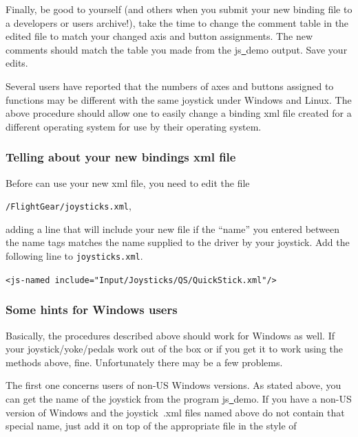 Finally, be good to yourself (and others when you submit your new binding file to a \FlightGear{} developers or users archive!), take the time to change the comment table in the edited file to match your changed axis and button assignments.  The new comments should match the table you made from the js\underline{~}demo output.  Save your edits.

Several users have reported that the numbers of axes and buttons assigned to functions may be different with the same joystick under Windows and Linux.  The above procedure should allow one to easily change a binding xml file created for a different operating system for use by their operating system.

\subsubsection{Telling \FlightGear{} about your new bindings xml file\label{telling}}
Before \FlightGear{} can use your new xml file, you need to edit the file

\noindent
 \texttt{/FlightGear/joysticks.xml},


\noindent 
adding a line that will include your new file if the ``name'' you entered between the name tags matches the name supplied to the driver by your joystick.  Add the following line to \texttt{joysticks.xml}.
\medskip

\noindent
	\texttt{<js-named include="Input/Joysticks/QS/QuickStick.xml"/>}
\medskip

\subsubsection{Some hints for Windows users\label{joyxp}}
Basically, the procedures described above should work for Windows as well. If your joystick/yoke/pedals work out of the box or if you get it to work using the methods above, fine. Unfortunately there may be a few problems.

The first one concerns users of non-US Windows versions. As stated above, you can get the name of the joystick from the program js\underline{~}demo. If you have a non-US version of Windows and the joystick~.xml files named above do not contain that special name, just add it on top of the appropriate file in the style of
\medskip

